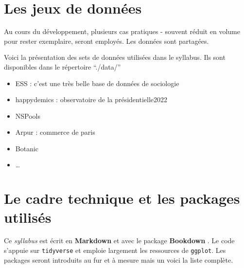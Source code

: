\documentclass[
]{book}
\providecommand{\tightlist}{%
  \setlength{\itemsep}{0pt}\setlength{\parskip}{0pt}}
\begin{document}
\hypertarget{les-jeux-de-donnuxe9es}{%
\section{Les jeux de données}\label{les-jeux-de-donnuxe9es}}

Au cours du développement, plusieurs cas pratiques - souvent réduit en volume pour rester exemplaire, seront employés. Les données sont partagées.

Voici la présentation des sets de données utilisées dans le syllabus. Ils sont disponibles dans le répertoire ``./data/''

\begin{itemize}
\tightlist
\item
  ESS : c'est une très belle base de données de sociologie
\item
  happydemics : observatoire de la présidentielle2022
\item
  NSPools
\item
  Arpur : commerce de paris
\item
  Botanic
\item
  \ldots{}
\end{itemize}

\hypertarget{le-cadre-technique-et-les-packages-utilisuxe9s}{%
\section{Le cadre technique et les packages utilisés}\label{le-cadre-technique-et-les-packages-utilisuxe9s}}

Ce \emph{syllabus} est écrit en \textbf{Markdown} \citep{allaire_rmarkdown_2021} et avec le package \textbf{Bookdown} \citep{R-bookdown}. Le code s'appuie sur \texttt{tidyverse} et emploie largement les ressources de \texttt{ggplot}. Les packages seront introduits au fur et à mesure mais un voici la liste complète.
\end{document}
